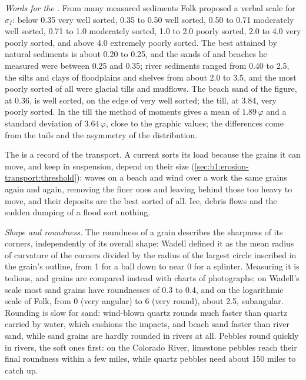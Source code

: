 \emph{Words for the .} From many measured sediments Folk proposed a
verbal scale for $\sigma_I$: below \num{0.35} very well sorted, \num{0.35} to
\num{0.50} well sorted, \num{0.50} to \num{0.71} moderately well sorted,
\num{0.71} to \num{1.0} moderately sorted, \num{1.0} to \num{2.0} poorly sorted,
\num{2.0} to \num{4.0} very poorly sorted, and above \num{4.0} extremely poorly
sorted. The best  attained by natural sediments is about \num{0.20} to
\num{0.25}, and the sands of  and beaches he measured were between
\num{0.25} and \num{0.35}; river sediments ranged from \num{0.40} to \num{2.5},
the silts and clays of floodplains and shelves from about \num{2.0} to \num{3.5},
and the most poorly sorted of all were glacial tills and mudflows. The beach
sand of the figure, at \num{0.36}, is well sorted, on the edge of very well
sorted; the till, at \num{3.84}, very poorly sorted. In the till the method of
moments gives a mean of $1.89\,\varphi$ and a standard deviation of
$3.64\,\varphi$, close to the graphic values; the differences come from the
tails and the asymmetry of the distribution.

The  is a record of the transport. A current sorts its load because the
grains it can move, and keep in suspension, depend on their size
(\cref{sec:b1:erosion-transport:threshold}): waves on a beach and wind over a
 work the same grains again and again, removing the finer ones and leaving
behind those too heavy to move, and their deposits are the best sorted of all.
Ice, debris flows and the sudden dumping of a flood sort nothing.

\emph{Shape and roundness.} The roundness of a grain describes the sharpness of
its corners, independently of its overall shape: Wadell defined it as the mean
radius of curvature of the corners divided by the radius of the largest circle
inscribed in the grain's outline, from 1 for a ball down to near 0 for a
splinter. Measuring it is tedious, and grains are compared instead with charts
of photographs; on Wadell's scale most sand grains have roundnesses of
\num{0.3} to \num{0.4}, and on the logarithmic scale of Folk, from 0 (very
angular) to 6 (very round), about \num{2.5}, subangular. Rounding is slow for
sand: wind-blown quartz rounds much faster than quartz carried by water, which
cushions the impacts, and beach sand faster than river sand, while sand grains
are hardly rounded in rivers at all. Pebbles round quickly in rivers, the soft
ones first: on the Colorado River, limestone pebbles reach their final roundness
within a few miles, while quartz pebbles need about 150 miles to catch up.

